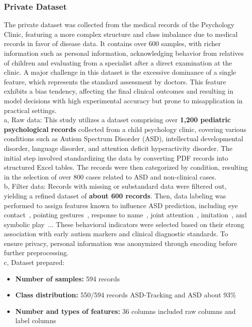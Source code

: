 \documentclass[conference]{IEEEtran}
\begin{document}
\subsubsection{Private Dataset}
The private dataset was collected from the medical records of the Psychology Clinic, featuring a more complex structure and class imbalance due to medical records in favor of disease data. It contains over 600 samples, with richer information such as personal information, acknowledging behavior from relatives of children and evaluating from a specialist after a direct examination at the clinic. A major challenge in this dataset is the excessive dominance of a single feature, which represents the standard assessment by doctors. This feature exhibits a bias tendency, affecting the final clinical outcomes and resulting in model decisions with high experimental accuracy but prone to misapplication in practical settings.\\

a, Raw data: This study utilizes a dataset comprising over \textbf{1,200 pediatric psychological records} collected from a child psychology clinic, covering various conditions such as Autism Spectrum Disorder (ASD), intellectual developmental disorder, language disorder, and attention deficit hyperactivity disorder. The initial step involved standardizing the data by converting PDF records into structured Excel tables. The records were then categorized by condition, resulting in the selection of over 800 cases related to ASD and non-clinical cases.\\

b, Filter data: Records with missing or substandard data were filtered out, yielding a refined dataset of \textbf{about 600 records}. Then, data labeling was performed to assign features known to influence ASD prediction, including eye contact~\cite{b8}, pointing gestures~\cite{b9}, response to name~\cite{b10}, joint attention~\cite{b11}, imitation~\cite{b12}, and symbolic play~\cite{b13}... These behavioral indicators were selected based on their strong association with early autism markers and clinical diagnostic standards. To ensure privacy, personal information was anonymized through encoding before further preprocessing.\\

c, Dataset prepared:
\begin{itemize}
    \item \textbf{Number of samples:} 594 records
    \item \textbf{Class distribution:} 550/594 records ASD-Tracking and ASD about 93\%
    \item \textbf{Number and types of features:} 36 columns included raw columns and label columns
\end{itemize}
\end{document}
